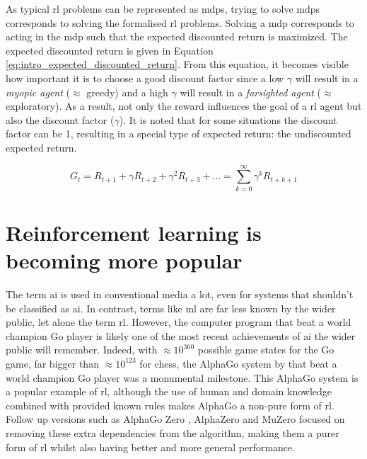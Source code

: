 As typical \gls{rl} problems can be represented as \glspl{mdp}, trying to solve \glspl{mdp} corresponds to solving the formalised \gls{rl} problems. Solving a \gls{mdp} corresponds to acting in the \gls{mdp} such that the expected discounted return is maximized.
The expected discounted return is given in Equation \ref{eq:intro_expected_discounted_return}.
From this equation, it becomes visible how important it is to choose a good discount factor since a low $\gamma$ will result in a \textit{myopic agent} ($\approx$ greedy) and a high $\gamma$ will result in a \textit{farsighted agent} ($\approx$ exploratory).
As a result, not only the reward influences the goal of a \gls{rl} agent but also the discount factor ($\gamma$).
It is noted that for some situations the discount factor can be 1, resulting in a special type of expected return: the undiscounted expected return.

\begin{equation}
G_t = R_{t+1} + \gamma R_{t+2} + \gamma^2 R_{t+3} + ... = \sum_{k=0}^{\infty}{\gamma^k R_{t+k+1}}
\label{eq:intro_expected_discounted_return}
\end{equation}



\section{Reinforcement learning is becoming more popular}
\label{sec:intro-popular}

The term \gls{ai} is used in conventional media a lot, even for systems that shouldn't be classified as \gls{ai}.
In contrast, terms like \gls{ml} are far less known by the wider public, let alone the term \gls{rl}.
However, the computer program that beat a world champion Go player is likely one of the most recent achievements of \gls{ai} the wider public will remember.
Indeed, with $\approx 10^{360}$ possible game states for the Go game, far bigger than $\approx 10^{123}$ for chess, the AlphaGo system by \citet{alphago} that beat a world champion Go player was a monumental milestone.
This AlphaGo system is a popular example of \gls{rl}, although the use of human and domain knowledge combined with provided known rules makes AlphaGo a non-pure form of \gls{rl}.
Follow up versions such as AlphaGo Zero \citep{alphago_zero}, AlphaZero \citep{alphazero} and MuZero \citep{muzero} focused on removing these extra dependencies from the algorithm, making them a purer form of \gls{rl} whilst also having better and more general performance. 

